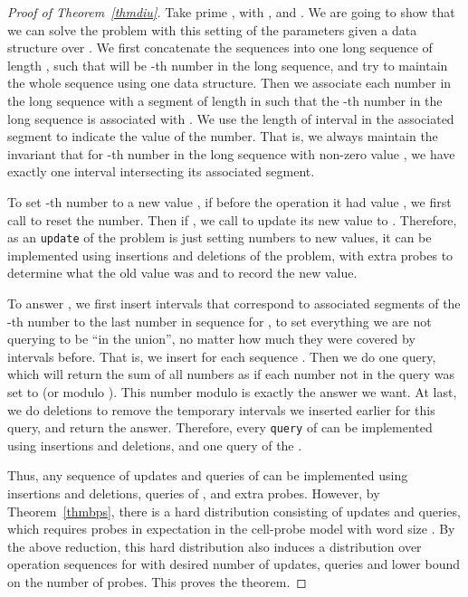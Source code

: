\documentclass[11pt]{article}
\begin{document}
\begin{proof}[Proof of Theorem~\ref{thmdiu}]

Take prime ,  with , and . We are going to show that we can solve the \bps{} problem with this setting of the parameters given a \diu{} data structure over . We first concatenate the  sequences into one long sequence of length , such that  will be -th number in the long sequence, and try to maintain the whole sequence using one \diu{} data structure. Then we associate each number in the long sequence with a segment of length  in  such that the -th number in the long sequence is associated with . We use the length of interval in the associated segment to indicate the value of the number. That is, we always maintain the invariant that for -th number in the long sequence with non-zero value , we have exactly one interval  intersecting its associated segment. 

To set -th number to a new value , if before the operation it had value , we first call  to reset the number. Then if , we call  to update its new value to . Therefore, as an \verb+update+ of the \bps{} problem is just setting  numbers to new values, it can be implemented using  insertions and deletions of the \diu{} problem, with  extra probes to determine what the old value was and to record the new value.

To answer , we first insert intervals that correspond to associated segments of the -th number to the last number in sequence  for , to set everything we are not querying to be ``in the union'', no matter how much they were covered by intervals before. That is, we insert  for each sequence . Then we do one query, which will return the sum of all numbers as if each number not in the query was set to  (or  modulo ). This number modulo  is exactly the answer we want. At last, we do  deletions to remove the temporary intervals we inserted earlier for this query, and return the answer. Therefore, every \verb+query+ of \bps{} can be implemented using  insertions and deletions, and one query of the \diu{}. 

Thus, any sequence of  updates and  queries of \bps{} can be implemented using  insertions and deletions,  queries of \diu{}, and extra  probes. However, by Theorem~\ref{thmbps}, there is a hard distribution consisting of  updates and  queries, which requires  probes in expectation in the cell-probe model with word size . By the above reduction, this hard distribution also induces a distribution over operation sequences for \diu{} with desired number of updates, queries and lower bound on the number of probes. This proves the theorem. 

\end{proof}
\end{document}
